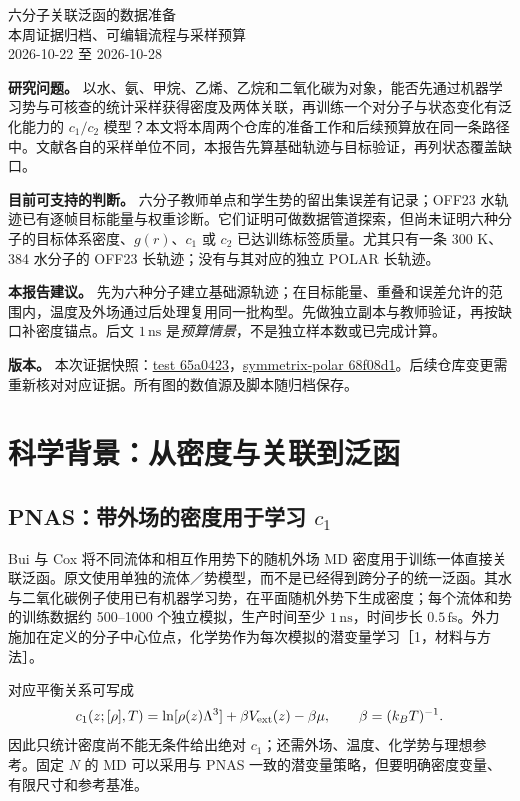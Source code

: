 \documentclass[11pt,a4paper]{article}
\begin{document}
\begin{center}{\LARGE 六分子关联泛函的数据准备}\\[7pt]
{\large 本周证据归档、可编辑流程与采样预算}\\[5pt]
2026-10-22 至 2026-10-28\end{center}

\noindent\textbf{研究问题。} 以水、氨、甲烷、乙烯、乙烷和二氧化碳为对象，能否先通过机器学习势与可核查的统计采样获得密度及两体关联，再训练一个对分子与状态变化有泛化能力的 $c_1/c_2$ 模型？本文将本周两个仓库的准备工作和后续预算放在同一条路径中。文献各自的采样单位不同，本报告先算基础轨迹与目标验证，再列状态覆盖缺口。

\textbf{目前可支持的判断。} 六分子教师单点和学生势的留出集误差有记录；OFF23 水轨迹已有逐帧目标能量与权重诊断。它们证明可做数据管道探索，但尚未证明六种分子的目标体系密度、$g(r)$、$c_1$ 或 $c_2$ 已达训练标签质量。尤其只有一条 300 K、384 水分子的 OFF23 长轨迹；没有与其对应的独立 POLAR 长轨迹。

\textbf{本报告建议。} 先为六种分子建立基础源轨迹；在目标能量、重叠和误差允许的范围内，温度及外场通过后处理复用同一批构型。先做独立副本与教师验证，再按缺口补密度锚点。后文 $1\,\mathrm{ns}$ 是\emph{预算情景}，不是独立样本数或已完成计算。

\textbf{版本。} 本次证据快照：\href{https://github.com/Yong-Q/test/tree/65a0423}{test 65a0423}，\href{https://github.com/Yong-Q/symmetrix-polar/tree/68f08d1}{symmetrix-polar 68f08d1}。后续仓库变更需重新核对对应证据。所有图的数值源及脚本随归档保存。

\section{科学背景：从密度与关联到泛函}
\subsection{PNAS：带外场的密度用于学习 $c_1$}
Bui 与 Cox 将不同流体和相互作用势下的随机外场 MD 密度用于训练一体直接关联泛函。原文使用单独的流体／势模型，而不是已经得到跨分子的统一泛函。其水与二氧化碳例子使用已有机器学习势，在平面随机外势下生成密度；每个流体和势的训练数据约 500--1000 个独立模拟，生产时间至少 $1\,\mathrm{ns}$，时间步长 $0.5\,\mathrm{fs}$。外力施加在定义的分子中心位点，化学势作为每次模拟的潜变量学习［1，材料与方法］。

对应平衡关系可写成
\begin{equation}
c_1(z;[\rho],T)=\ln[\rho(z)\Lambda^3]+\beta V_{\rm ext}(z)-\beta\mu,\qquad \beta=(k_BT)^{-1}.
\end{equation}
因此只统计密度尚不能无条件给出绝对 $c_1$；还需外场、温度、化学势与理想参考。固定 $N$ 的 MD 可以采用与 PNAS 一致的潜变量策略，但要明确密度变量、有限尺寸和参考基准。
\end{document}
